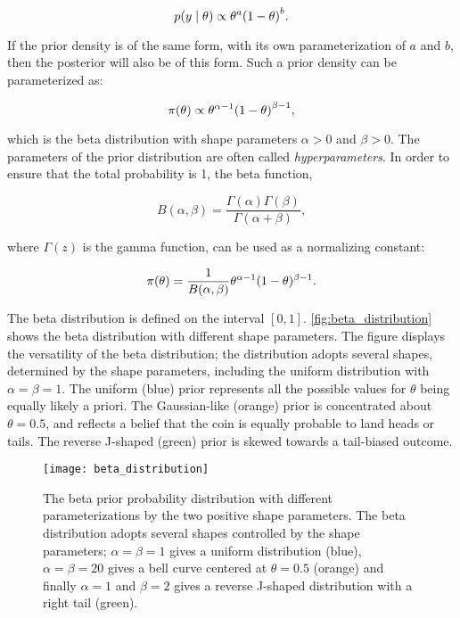 \begin{equation*}
    p \qty(y \mid \theta) \propto \theta^a \qty(1 - \theta)^b.
\end{equation*} 

If the prior density is of the same form, with its own parameterization of $a$ and $b$, then the posterior will also be of this form. Such a prior density can be parameterized as: 

\begin{equation*}
    \pi \qty(\theta) \propto \theta^{\alpha - 1} \qty(1 - \theta)^{\beta -1},
\end{equation*}

which is the beta distribution with shape parameters $\alpha>0$ and $\beta>0$. The parameters of the prior distribution are often called \textit{hyperparameters}. In order to ensure that the total probability is 1, the beta function,

\begin{equation*}
    B (\alpha, \beta) = \frac{\Gamma(\alpha)\Gamma(\beta)}{\Gamma(\alpha + \beta)},
\end{equation*}

where $\Gamma (z)$ is the gamma function, can be used as a normalizing constant:

\begin{equation}\label{eq:beta_prior}
    \pi \qty(\theta) = \frac{1}{B(\alpha, \beta)} \theta^{\alpha -1} (1-\theta)^{\beta -1}.
\end{equation}

The beta distribution is defined on the interval $[0, 1]$. \autoref{fig:beta_distribution} shows the beta distribution with different shape parameters. The figure displays the versatility of the beta distribution; the distribution adopts several shapes, determined by the shape parameters, including the uniform distribution with $\alpha = \beta = 1$. The uniform (blue) prior represents all the possible values for $\theta$ being equally likely a priori. The Gaussian-like (orange) prior is concentrated about $\theta=0.5$, and reflects a belief that the coin is equally probable to land heads or tails. The reverse J-shaped (green) prior is skewed towards a tail-biased outcome.

\begin{figure}[ht]
    \centering
    \texttt{[image: beta\_distribution]}
    \caption{The beta prior probability distribution with different parameterizations by the two positive shape parameters. The beta distribution adopts several shapes controlled by the shape parameters; $\alpha=\beta=1$ gives a uniform distribution (blue), $\alpha=\beta=20$ gives a bell curve centered at $\theta=0.5$ (orange) and finally $\alpha=1$ and $\beta=2$ gives a reverse J-shaped distribution with a right tail (green).
    }
    \label{fig:beta_distribution}
\end{figure} 


